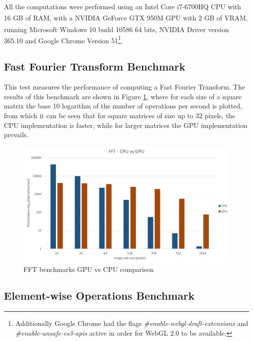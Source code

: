     All the computations were performed using an Intel\textsuperscript{\textregistered} Core\textsuperscript{\texttrademark} i7-6700HQ CPU with 16 GB of RAM, with a NVIDIA\textsuperscript{\textregistered} GeForce\textsuperscript{\textregistered} GTX 950M GPU with 2 GB of VRAM, running Microsoft\textsuperscript{\textregistered} Windows\textsuperscript{\textregistered} 10 build 10586 64 bits, NVIDIA Driver version 365.10 and Google Chrome Version 51\footnote{Additionally Google Chrome had the flags \textit{\#enable-webgl-draft-extensions} and \textit{\#enable-unsafe-es3-apis} active in order for WebGL 2.0 to be available.}.
    
    \subsection{Fast Fourier Transform Benchmark}
    
      This test measures the performance of computing a Fast Fourier Transform. The results of this benchmark are shown in Figure \ref{fig:plot-fft}, where for each size of a square matrix the base 10 logarithm of the number of operations per second is plotted, from which it can be seen that for square matrices of size up to 32 pixels, the CPU implementation is faster, while for larger matrices the GPU implementation prevails.
    
      \begin{figure}[H]
      	\centering
      	\includegraphics[width=\plotwidth]{images/results/benchmarks/plot-fft}
      	\caption{FFT benchmarks GPU vs CPU comparison}
      	\label{fig:plot-fft}
      \end{figure}
      
    \subsection{Element-wise Operations Benchmark}
    
